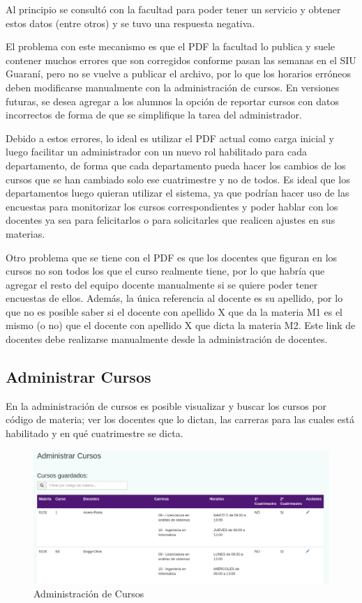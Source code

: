 \documentclass[a4paper]{article}
\begin{document}
Al principio se consultó con la facultad para poder tener un servicio y obtener estos datos (entre otros) y se tuvo una respuesta negativa.

El problema con este mecanismo es que el PDF la facultad lo publica y suele contener muchos errores que son corregidos conforme pasan las semanas en el SIU Guaraní, pero no se vuelve a publicar el archivo, por lo que los horarios erróneos deben modificarse manualmente con la administración de cursos. En versiones futuras, se desea agregar a los alumnos la opción de reportar cursos con datos incorrectos de forma de que se simplifique la tarea del administrador.

Debido a estos errores, lo ideal es utilizar el PDF actual como carga inicial y luego facilitar un administrador con un nuevo rol habilitado para cada departamento, de forma que cada departamento pueda hacer los cambios de los cursos que se han cambiado solo ese cuatrimestre y no de todos. Es ideal que los departamentos luego quieran utilizar el sistema, ya que podrían hacer uso de las encuestas para monitorizar los cursos correspondientes y poder hablar con los docentes ya sea para felicitarlos o para solicitarles que realicen ajustes en sus materias.

Otro problema que se tiene con el PDF es que los docentes que figuran en los cursos no son todos los que el curso realmente tiene, por lo que habría que agregar el resto del equipo docente manualmente si se quiere poder tener encuestas de ellos. Además, la única referencia al docente es su apellido, por lo que no es posible saber si el docente con apellido X que da la materia M1 es el mismo (o no) que el docente con apellido X que dicta la materia M2. Este link de docentes debe realizarse manualmente desde la administración de docentes.

\subsection{Administrar Cursos}

En la administración de cursos es posible visualizar y buscar los cursos por código de materia; ver los docentes que lo dictan, las carreras para las cuales está habilitado y en qué cuatrimestre se dicta.

\begin{figure}[H]
\centering
\includegraphics[scale=0.3]{Imagenes/administrar_cursos.png}\par
\caption{Administración de Cursos}
\end{figure}
\end{document}
